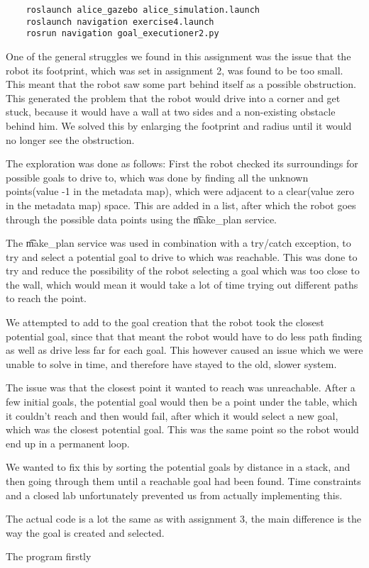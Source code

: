
\begin{lstlisting}
	roslaunch alice_gazebo alice_simulation.launch	
	roslaunch navigation exercise4.launch
	rosrun navigation goal_executioner2.py
\end{lstlisting}

One of the general struggles we found in this assignment was the issue that the robot its footprint, which was set in assignment 2, was found to be too small. This meant that the robot saw some part behind itself as a possible obstruction. This generated the problem that the robot would drive into a corner and get stuck, because it would have a wall at two sides and a non-existing obstacle behind him. We solved this by enlarging the footprint and radius until it would no longer see the obstruction.

The exploration was done as follows: First the robot checked its surroundings for possible goals to drive to, which was done by finding all the unknown points(value -1 in the metadata map), which were adjacent to a clear(value zero in the metadata map) space. This are added in a list, after which the robot goes through the possible data points using the \t{make_plan} service.

The \t{make_plan} service was used in combination with a try/catch exception, to try and select a potential goal to drive to which was reachable. This was done to try and reduce the possibility of the robot selecting a goal which was too close to the wall, which would mean it would take a lot of time trying out different paths to reach the point.

We attempted to add to the goal creation that the robot took the closest potential goal, since that that meant the robot would have to do less path finding as well as drive less far for each goal. This however caused an issue which we were unable to solve in time, and therefore have stayed to the old, slower system. 

The issue was that the closest point it wanted to reach was unreachable. After a few initial goals, the potential goal would then be a point under the table, which it couldn't reach and then would fail, after which it would select a new goal, which was the closest potential goal. This was the same point so the robot would end up in a permanent loop.

We wanted to fix this by sorting the potential goals by distance in a stack, and then going through them until a reachable goal had been found. Time constraints and a closed lab unfortunately prevented us from actually implementing this.

The actual code is a lot the same as with assignment 3, the main difference is the way the goal is created and selected.



The program firstly


